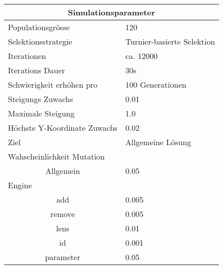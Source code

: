 
    \begin{tabular}{ | l | l | }
      \hline
      \multicolumn{2}{|c|}{Simulationsparameter} \\
      \hline
      Populationsgrösse & 120 \\ \hline
      Selektionsstrategie & Turnier-basierte Selektion \\ \hline
      Iterationen & ca. 12000 \\ \hline
      Iterations Dauer & 30s \\ \hline
      Schwierigkeit erhöhen pro & 100 Generationen \\ \hline
      Steigungs Zuwachs & 0.01 \\ \hline
      Maximale Steigung & 1.0 \\ \hline
      Höchste Y-Koordinate Zuwachs  & 0.02 \\ \hline
      Ziel & Allgemeine Lösung \\ \hline
      \multicolumn{2}{|l|}{Wahscheinlichkeit Mutation}\\ \hline
      \multicolumn{1}{|c|}{Allgemein} & 0.05 \\ \hline
      Engine &  \\ \hline
      \multicolumn{1}{|c|}{add} & 0.005 \\ \hline
      \multicolumn{1}{|c|}{remove} & 0.005 \\ \hline
      \multicolumn{1}{|c|}{lens} & 0.01 \\ \hline
      \multicolumn{1}{|c|}{id} & 0.001 \\ \hline
      \multicolumn{1}{|c|}{parameter} & 0.05 \\ \hline
    \end{tabular}
